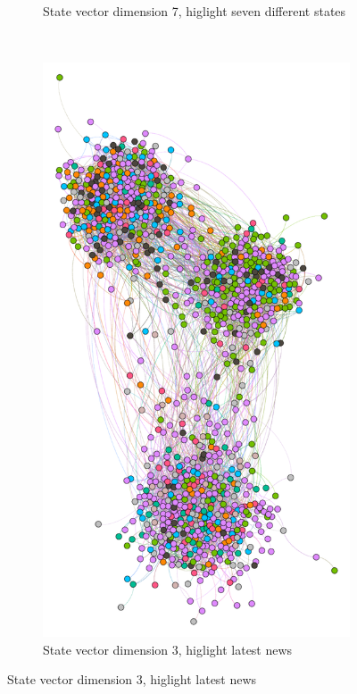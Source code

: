 \begin{figure}
\begin{subfigure}[t]{0.35\textwidth}
    \caption{State vector dimension 7, higlight
      seven different states}
    \label{fig:bubble7mod}
  \end{subfigure}
  \\
  \begin{subfigure}[t]{0.25\textwidth}
    \includegraphics[width=\textwidth]{img/dim3_news.pdf}
    \caption{State vector dimension 3, higlight
     latest news}

\end{subfigure}
\end{figure}
